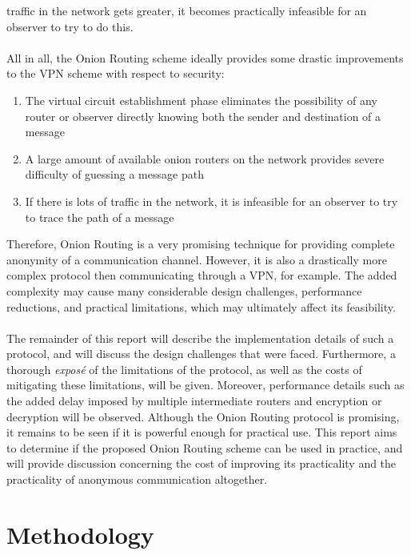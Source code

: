 \documentclass[10pt]{report}
\begin{document}
traffic in the network gets greater, it becomes practically infeasible for an observer to try to do
this.\\\\
All in all, the Onion Routing scheme ideally provides some drastic improvements to the VPN scheme
with respect to security:
\begin{enumerate}
	\item The virtual circuit establishment phase eliminates the possibility of any router or
		observer directly knowing both the sender and destination of a message
	\item A large amount of available onion routers on the network provides severe difficulty of
		guessing a message path
	\item If there is lots of traffic in the network, it is infeasible for an observer to try to
		trace the path of a message
\end{enumerate}
Therefore, Onion Routing is a very promising technique for providing complete anonymity of a
communication channel. However, it is also a drastically more complex protocol then communicating
through a VPN, for example. The added complexity may cause many considerable design challenges,
performance reductions, and practical limitations, which may ultimately affect its feasibility.\\\\
The remainder of this report will describe the implementation details of such a protocol, and will
discuss the design challenges that were faced. Furthermore, a thorough \textit{expos\'e} of the
limitations of the protocol, as well as the costs of mitigating these limitations, will be given.
Moreover, performance details such as the added delay imposed by multiple intermediate routers and
encryption or decryption will be observed. Although the Onion Routing protocol is promising, it
remains to be seen if it is powerful enough for practical use. This report aims to determine if the
proposed Onion Routing scheme can be used in practice, and will provide discussion concerning the
cost of improving its practicality and the practicality of anonymous communication altogether.

\chapter{Methodology}
\end{document}

